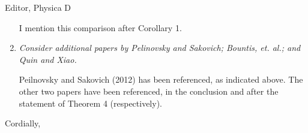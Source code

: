 \documentclass[11pt]{letter}
\begin{document}
\begin{letter}{Editor, Physica D}
\begin{enumerate}
\vspace{4mm}
I mention this comparison after Corollary 1.
\vspace{4mm}

\item \emph{Consider additional papers by Pelinovsky and Sakovich; Bountis, et. al.; and Quin and Xiao.}

\vspace{4mm}
Peilnovsky and Sakovich (2012) has been referenced, as indicated above. The other two papers have been referenced, in the conclusion and after the statement of Theorem 4 (respectively).
\vspace{4mm}

\end{enumerate}

\closing{Cordially,}

\end{letter}
\end{document}
